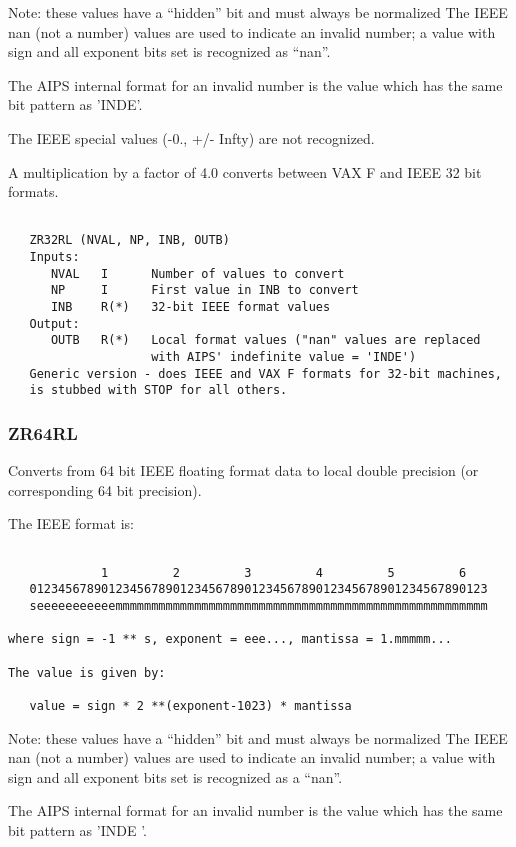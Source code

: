 Note: these values have a ``hidden'' bit and must always be normalized
The IEEE nan (not a number) values are used to indicate an invalid
number; a value with sign and all exponent bits set is recognized as ``nan''.

The AIPS internal format for an invalid number is the value which
has the same bit pattern as 'INDE'.

The IEEE special values (-0., +/- Infty) are not recognized.

A multiplication by a factor of 4.0 converts between VAX F and IEEE
32 bit formats.
\begin{verbatim}

   ZR32RL (NVAL, NP, INB, OUTB)
   Inputs:
      NVAL   I      Number of values to convert
      NP     I      First value in INB to convert
      INB    R(*)   32-bit IEEE format values
   Output:
      OUTB   R(*)   Local format values ("nan" values are replaced
                    with AIPS' indefinite value = 'INDE')
   Generic version - does IEEE and VAX F formats for 32-bit machines,
   is stubbed with STOP for all others.
\end{verbatim}

\subsubsection{ZR64RL}
Converts from 64 bit IEEE floating format data to local double
precision (or corresponding 64 bit precision).

The IEEE format is:
\begin{verbatim}

             1         2         3         4         5         6
   0123456789012345678901234567890123456789012345678901234567890123
   seeeeeeeeeeemmmmmmmmmmmmmmmmmmmmmmmmmmmmmmmmmmmmmmmmmmmmmmmmmmmm

where sign = -1 ** s, exponent = eee..., mantissa = 1.mmmmm...

The value is given by:

   value = sign * 2 **(exponent-1023) * mantissa

\end{verbatim}
Note: these values have a ``hidden'' bit and must always be normalized
The IEEE nan (not a number) values are used to indicate an invalid
number; a value with sign and all exponent bits set is recognized as a ``nan''.

The AIPS internal format for an invalid number is the value which
has the same bit pattern as 'INDE    '.

